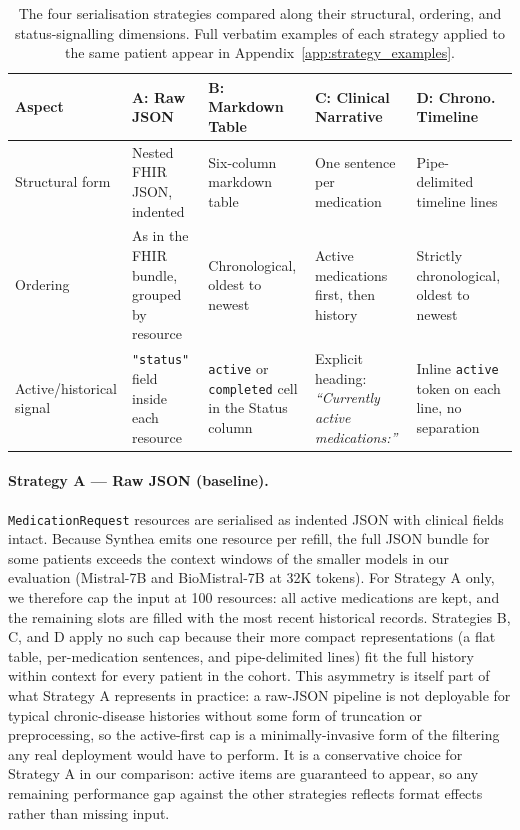 \begin{table}[t]
\centering
\small
\renewcommand{\arraystretch}{1.25}
\begin{tabular}{p{2.4cm} p{3.2cm} p{3.2cm} p{3.2cm} p{3.2cm}}
\toprule
\textbf{Aspect} & \textbf{A: Raw JSON} & \textbf{B: Markdown Table} & \textbf{C: Clinical Narrative} & \textbf{D: Chrono. Timeline} \\
\midrule
Structural form &
Nested FHIR JSON, indented &
Six-column markdown table &
One sentence per medication &
Pipe-delimited timeline lines \\

Ordering &
As in the FHIR bundle, grouped by resource &
Chronological, oldest to newest &
Active medications first, then history &
Strictly chronological, oldest to newest \\

Active/historical signal &
\texttt{"status"} field inside each resource &
\texttt{active} or \texttt{completed} cell in the Status column &
Explicit heading: \textit{``Currently active medications:''} &
Inline \texttt{active} token on each line, no separation \\
\bottomrule
\end{tabular}
\caption{The four serialisation strategies compared along their structural, ordering,
  and status-signalling dimensions. Full verbatim examples of each strategy applied
  to the same patient appear in Appendix~\ref{app:strategy_examples}.}
\label{tab:strategy_comparison}
\end{table}

\paragraph{Strategy A — Raw JSON (baseline).}
\texttt{MedicationRequest} resources are serialised as indented JSON with clinical
fields intact. Because Synthea emits one resource per refill, the full JSON bundle
for some patients exceeds the context windows of the smaller models in our evaluation
(Mistral-7B and BioMistral-7B at 32K tokens). For Strategy A only, we therefore cap
the input at 100 resources: all active medications are kept, and the remaining slots
are filled with the most recent historical records. Strategies B, C, and D apply no
such cap because their more compact representations (a flat table, per-medication
sentences, and pipe-delimited lines) fit the full history within context for every
patient in the cohort. This asymmetry is itself part of what Strategy A represents
in practice: a raw-JSON pipeline is not deployable for typical chronic-disease
histories without some form of truncation or preprocessing, so the active-first cap
is a minimally-invasive form of the filtering any real deployment would have to
perform. It is a conservative choice for Strategy A in our comparison: active items
are guaranteed to appear, so any remaining performance gap against the other
strategies reflects format effects rather than missing input.


